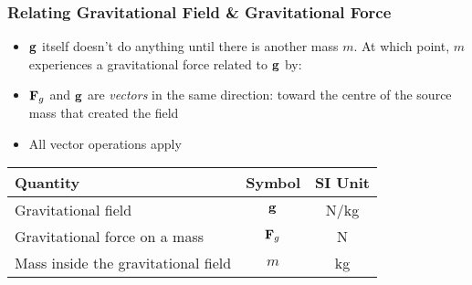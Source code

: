 \documentclass[12pt,compress,aspectratio=169]{beamer}
\newcommand{\mb}[1]{\ensuremath\mathbf{#1}}
\begin{document}
\begin{frame}
  \frametitle{Relating Gravitational Field \& Gravitational Force}
  \begin{itemize}
  \item $\mb{g}$ itself doesn't do anything until there is another mass $m$.
    At which point, $m$ experiences a gravitational force  related to $\mb{g}$
    by:

    \vspace{-0.2in}{\Large
      \begin{displaymath}
        \boxed{\mb{g}=\frac{\mb{F}_g}{m}}
      \end{displaymath}
    }
  \item $\mb{F}_g$ and  $\mb{g}$ are \emph{vectors} in the same direction:
    toward the centre of the source mass that created the field
  \item All vector operations apply
  \end{itemize}

  \begin{center}
    \begin{tabular}{l|c|c}
      \rowcolor{pink}
      \textbf{Quantity} & \textbf{Symbol} & \textbf{SI Unit} \\ \hline
      Gravitational field & $\mb{g}$   & \si{N/kg}\\
      Gravitational force on a mass & $\mb{F}_g$ & \si{N} \\
      Mass inside the gravitational field & $m$ & \si{kg} \\
    \end{tabular}
  \end{center}
\end{frame}
\end{document}
